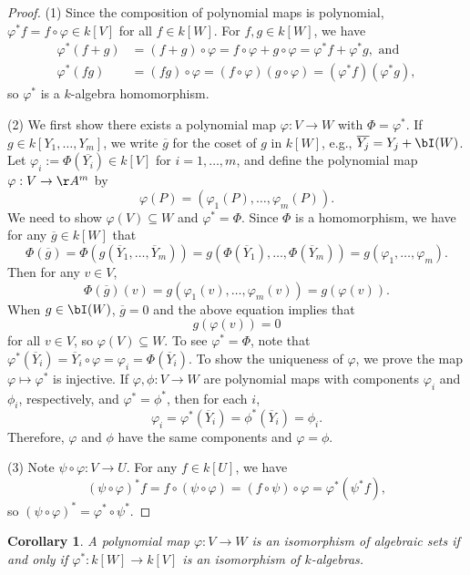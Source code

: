 \documentclass[12pt]{amsart}
\theoremstyle{plain}
\newtheorem{corollary}[theorem]{Corollary}
\theoremstyle{definition}
\begin{document}
\begin{proof}
(1) Since the composition of polynomial maps is polynomial, $\varphi^* f = f \circ \varphi \in k[V]$ for all $f \in k[W]$.
For $f, g \in k[W]$, we have
\begin{align*}
	\varphi^*(f + g) &= (f+g)\circ\varphi = f\circ\varphi + g\circ\varphi = \varphi^*f + \varphi^*g, \text{ and } \\
	\varphi^*(fg) &= (fg)\circ\varphi = (f\circ\varphi)(g\circ\varphi) = (\varphi^* f)(\varphi^* g),
\end{align*}
so $\varphi^*$ is a $k$-algebra homomorphism.

(2) We first show there exists a polynomial map $\varphi : V \to W$ with $\Phi = \varphi^*$.
If $g \in k[Y_1, \ldots, Y_m]$, we write $\overline{g}$ for the coset of $g$ in $k[W]$, e.g., $\overline{Y_j} = Y_j + \bI(W)$.
Let $\varphi_i := \Phi(\overline{Y_i}) \in k[V]$ for $i=1,\ldots,m$, and define the polynomial map $\varphi:V \to \AA^m$ by
$$\varphi(P) = (\varphi_1(P), \ldots, \varphi_m(P)).$$
We need to show $\varphi(V) \subseteq W$ and $\varphi^* = \Phi$.
Since $\Phi$ is a homomorphism, we have for any $\overline{g} \in k[W]$ that
$$\Phi(\overline{g}) =\Phi(g(\overline{Y}_1, \ldots, \overline{Y}_m)) = g(\Phi(\overline{Y}_1), \ldots, \Phi(\overline{Y}_m)) = g(\varphi_1, \ldots, \varphi_m).$$
Then for any $v \in V$,
$$\Phi(\overline{g})(v) = g(\varphi_1(v), \ldots, \varphi_m(v)) = g(\varphi(v)).$$
When $g \in \bI(W)$, $\overline{g} = 0$ and the above equation implies that
$$g(\varphi(v)) = 0$$
for all $v \in V$, so $\varphi(V) \subseteq W$.
To see $\varphi^* = \Phi$, note that $\varphi^*(\overline{Y}_i) = \overline{Y}_i \circ \varphi = \varphi_i = \Phi(\overline{Y}_i).$
To show the uniqueness of $\varphi$, we prove the map $\varphi \mapsto \varphi^*$ is injective.
If $\varphi, \phi:V \to W$ are polynomial maps with components $\varphi_i$ and $\phi_i$, respectively, and $\varphi^*=\phi^*$, then for each $i$, 
$$\varphi_i = \varphi^*(\overline{Y}_i) = \phi^*(\overline{Y}_i) = \phi_i.$$
Therefore, $\varphi$ and $\phi$ have the same components and $\varphi=\phi$.

(3) Note $\psi \circ \varphi:V \to U$.
For any $f \in k[U]$, we have
$$(\psi \circ \varphi)^* f = f \circ (\psi \circ \varphi) = (f \circ \psi) \circ \varphi = \varphi^*(\psi^* f),$$
so $(\psi \circ \varphi)^* = \varphi^* \circ \psi^*$.
\end{proof}

\begin{corollary}\label{isoofalgsetscoro}
A polynomial map $\varphi:V \to W$ is an isomorphism of algebraic sets if and only if $\varphi^*:k[W]\to k[V]$ is an isomorphism of $k$-algebras.
\end{corollary}
\end{document}
